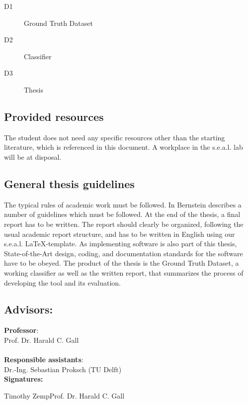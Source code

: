 \documentclass{task_description}
\begin{document}
\begin{description}
\item[D1] Ground Truth Dataset
\item[D2] Classifier
\item[D3] Thesis
\end{description}

\subsection*{Provided resources}

The student does not need any specific resources other than the starting literature, which is referenced in this document. A workplace in the s.e.a.l. lab will be at disposal.

\subsection*{General thesis guidelines}

The typical rules of academic work must be followed. In Bernstein \cite{Bernstein:8} describes a number of guidelines which must be followed. At the end of the thesis, a final report has to be written. The report should clearly be organized, following the usual academic report structure, and has to be written in English using our s.e.a.l. \LaTeX-template. As implementing software is also part of this thesis, State-of-the-Art
design, coding, and documentation standards for the software have to be obeyed. The product of the thesis is the Ground Truth Dataset, a working classifier as well as the written report, that summarizes the process of developing the tool and its evaluation.

\subsection*{Advisors:}



\noindent\textbf{Professor}: \\
\noindent Prof. Dr. Harald C. Gall \\
\\
\noindent\textbf{Responsible assistants}: \\
\noindent Dr.-Ing. Sebastian Proksch (TU Delft) \\


\vspace{2em}
\noindent\textbf{Signatures:}

\vspace{3\baselineskip}
\noindent Timothy Zemp\hfill Prof. Dr. Harald C. Gall
\clearpage
\label{gantt}


\end{document}
